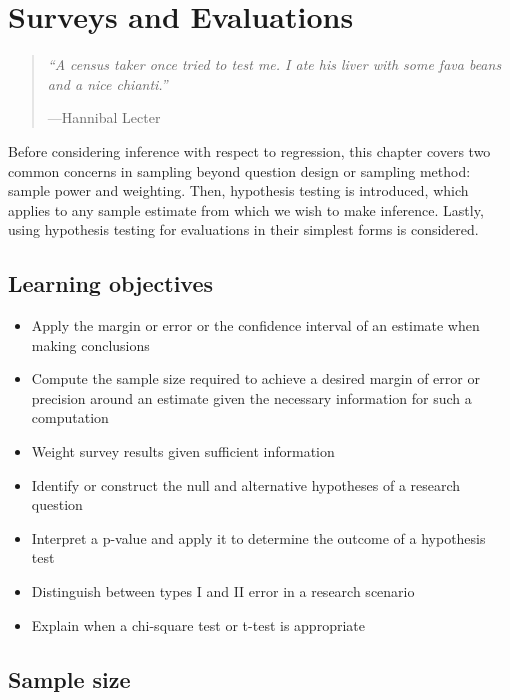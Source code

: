 \documentclass[
]{book}
\providecommand{\tightlist}{%
  \setlength{\itemsep}{0pt}\setlength{\parskip}{0pt}}
\newenvironment{learncheck}%
{%
  \par\vspace{\baselineskip}\noindent 
  \color{Exercise}\begin{itshape}%
  \par\vspace{\baselineskip}\noindent\ignorespaces 
}%
{%
  \end{itshape}\ignorespacesafterend 
}
\begin{document}
\hypertarget{surveys-and-evaluations}{%
\chapter{Surveys and Evaluations}\label{surveys-and-evaluations}}

\begin{quote}
\emph{``A census taker once tried to test me. I ate his liver with some fava beans and a nice chianti.''}

---Hannibal Lecter
\end{quote}

Before considering inference with respect to regression, this chapter covers two common concerns in sampling beyond question design or sampling method: sample power and weighting. Then, hypothesis testing is introduced, which applies to any sample estimate from which we wish to make inference. Lastly, using hypothesis testing for evaluations in their simplest forms is considered.

\hypertarget{lo11}{%
\section{Learning objectives}\label{lo11}}

\begin{learncheck}
\begin{itemize}
\tightlist
\item
  Apply the margin or error or the confidence interval of an estimate
  when making conclusions
\item
  Compute the sample size required to achieve a desired margin of error
  or precision around an estimate given the necessary information for
  such a computation
\item
  Weight survey results given sufficient information
\item
  Identify or construct the null and alternative hypotheses of a
  research question
\item
  Interpret a p-value and apply it to determine the outcome of a
  hypothesis test
\item
  Distinguish between types I and II error in a research scenario
\item
  Explain when a chi-square test or t-test is appropriate
\end{itemize}
\end{learncheck}

\hypertarget{sample-size}{%
\section{Sample size}\label{sample-size}}
\end{document}
